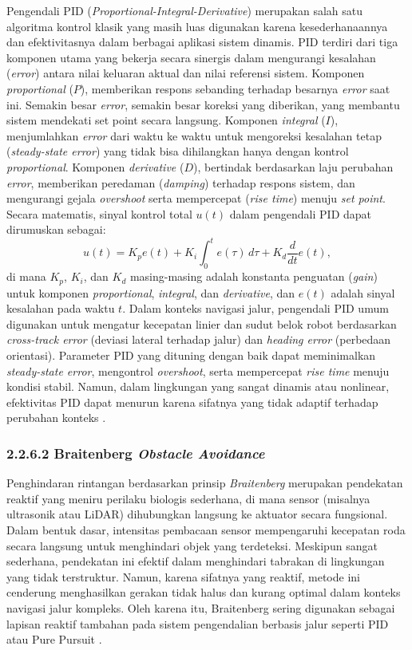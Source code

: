 Pengendali PID (\emph{Proportional-Integral-Derivative}) merupakan salah satu algoritma kontrol klasik yang masih luas digunakan karena kesederhanaannya dan efektivitasnya dalam berbagai aplikasi sistem dinamis. PID terdiri dari tiga komponen utama yang bekerja secara sinergis dalam mengurangi kesalahan (\emph{error}) antara nilai keluaran aktual dan nilai referensi sistem. Komponen  \emph{proportional} (\(P\)), memberikan respons sebanding terhadap besarnya \emph{error} saat ini. Semakin besar \emph{error}, semakin besar koreksi yang diberikan, yang membantu sistem mendekati set point secara langsung. Komponen  \emph{integral} (\(I\)), menjumlahkan \emph{error} dari waktu ke waktu untuk mengoreksi kesalahan tetap (\emph{steady-state error}) yang tidak bisa dihilangkan hanya dengan kontrol \emph{proportional}. Komponen \emph{derivative} (\(D\)), bertindak berdasarkan laju perubahan \emph{error}, memberikan peredaman (\emph{damping}) terhadap respons sistem, dan mengurangi gejala \emph{overshoot} serta mempercepat  (\emph{rise time}) menuju \emph{set point}. Secara matematis, sinyal kontrol total \( u(t) \) dalam pengendali PID dapat dirumuskan sebagai:
\begin{equation}
    u(t) = K_p e(t) + K_i \int_{0}^{t} e(\tau) \, d\tau + K_d \frac{d}{dt}e(t),
\end{equation}
di mana \( K_p \), \( K_i \), dan \( K_d \) masing-masing adalah konstanta penguatan (\emph{gain}) untuk komponen \emph{proportional}, \emph{integral}, dan \emph{derivative}, dan \( e(t) \) adalah sinyal kesalahan pada waktu \( t \). Dalam konteks navigasi jalur, pengendali PID umum digunakan untuk mengatur kecepatan linier dan sudut belok robot berdasarkan \emph{cross-track error} (deviasi lateral terhadap jalur) dan \emph{heading error} (perbedaan orientasi). Parameter PID yang dituning dengan baik dapat meminimalkan \emph{steady-state error}, mengontrol \emph{overshoot}, serta mempercepat \emph{rise time} menuju kondisi stabil. Namun, dalam lingkungan yang sangat dinamis atau nonlinear, efektivitas PID dapat menurun karena sifatnya yang tidak adaptif terhadap perubahan konteks \cite{astrom1995pid}.


\subsubsection{2.2.6.2 Braitenberg \emph{Obstacle Avoidance}}

Penghindaran rintangan berdasarkan prinsip \emph{Braitenberg} merupakan pendekatan reaktif yang meniru perilaku biologis sederhana, di mana sensor (misalnya ultrasonik atau LiDAR) dihubungkan langsung ke aktuator secara fungsional. Dalam bentuk dasar, intensitas pembacaan sensor mempengaruhi kecepatan roda secara langsung untuk menghindari objek yang terdeteksi. Meskipun sangat sederhana, pendekatan ini efektif dalam menghindari tabrakan di lingkungan yang tidak terstruktur. Namun, karena sifatnya yang reaktif, metode ini cenderung menghasilkan gerakan tidak halus dan kurang optimal dalam konteks navigasi jalur kompleks. Oleh karena itu, Braitenberg sering digunakan sebagai lapisan reaktif tambahan pada sistem pengendalian berbasis jalur seperti PID atau Pure Pursuit \cite{braitenberg1986vehicles}.

